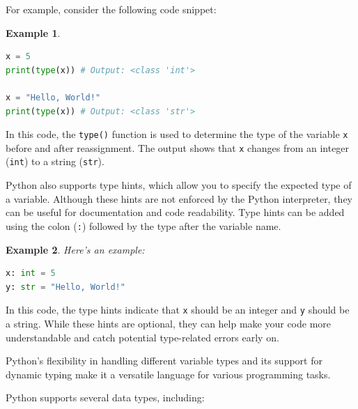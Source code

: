 \documentclass[12pt]{article}
\newtheorem{Example}{Example}[section]
\begin{document}
For example, consider the following code snippet:

\begin{Example}
\begin{lstlisting}[language=Python]
x = 5
print(type(x)) # Output: <class 'int'>

x = "Hello, World!"
print(type(x)) # Output: <class 'str'>
\end{lstlisting}
\end{Example}

In this code, the \texttt{type()} function is used to determine the type of the variable \texttt{x} before and after reassignment. The output shows that \texttt{x} changes from an integer (\texttt{int}) to a string (\texttt{str}).

Python also supports type hints, which allow you to specify the expected type of a variable. Although these hints are not enforced by the Python interpreter, they can be useful for documentation and code readability. Type hints can be added using the colon (\texttt{:}) followed by the type after the variable name.

\begin{Example}
Here's an example:

\begin{lstlisting}[language=Python]
x: int = 5
y: str = "Hello, World!"
\end{lstlisting}
\end{Example}
In this code, the type hints indicate that \texttt{x} should be an integer and \texttt{y} should be a string. While these hints are optional, they can help make your code more understandable and catch potential type-related errors early on.

Python's flexibility in handling different variable types and its support for dynamic typing make it a versatile language for various programming tasks.


Python supports several data types, including:
\end{document}
